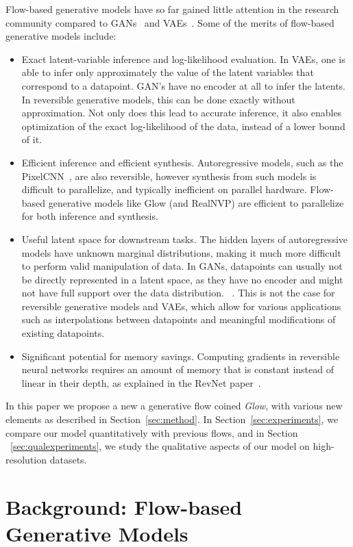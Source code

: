 \documentclass{article}
\begin{document}
Flow-based generative models have so far gained little attention in the research community compared to GANs~\citep{goodfellow2014generative} and VAEs~\citep{kingma2013auto}. Some of the merits of flow-based generative models include:
\begin{itemize}
\item Exact latent-variable inference and log-likelihood evaluation. In VAEs, one is able to infer only approximately the value of the latent variables that correspond to a datapoint. GAN’s have no encoder at all to infer the latents. In reversible generative models, this can be done exactly without approximation. Not only does this lead to accurate inference, it also enables optimization of the exact log-likelihood of the data, instead of a lower bound of it.
\item Efficient inference and efficient synthesis. Autoregressive models, such as the PixelCNN~\citep{oord2016conditional}, are also reversible, however synthesis from such models is difficult to parallelize, and typically inefficient on parallel hardware. Flow-based generative models like Glow (and RealNVP) are efficient to parallelize for both inference and synthesis.
\item Useful latent space for downstream tasks. The hidden layers of autoregressive models have unknown marginal distributions, making it much more difficult to perform valid manipulation of data. In GANs, datapoints can usually not be directly represented in a latent space, as they have no encoder and might not have full support over the data distribution. ~\citep{grover2018flow}. This is not the case for reversible generative models and VAEs, which allow for various applications such as interpolations between datapoints and meaningful modifications of existing datapoints.
\item Significant potential for memory savings. Computing gradients in reversible neural networks requires an amount of memory that is constant instead of linear in their depth, as explained in the RevNet paper~\citep{gomez2017reversible}.
\end{itemize}

In this paper we propose a new a generative flow coined \emph{Glow}, with various new elements as described in Section~\ref{sec:method}. In Section~\ref{sec:experiments}, we compare our model quantitatively with previous flows, and in Section ~\ref{sec:qualexperiments}, we study the qualitative aspects of our model on high-resolution datasets.

\section{Background: Flow-based Generative Models}\label{sec:flow}

\end{document}
